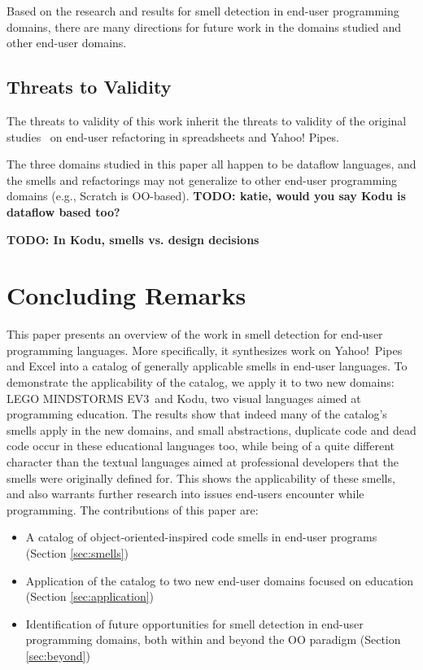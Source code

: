 \documentclass{sig-alternate}
\newcommand{\todo}[1]{\textbf{TODO: #1}}
\newcommand{\ms}{LEGO MINDSTORMS EV3}
\begin{document}
Based on the research and results for smell detection in end-user programming domains, there are many directions for future work in the domains studied and other end-user domains.





\subsection{Threats to Validity}
The threats to validity of this work inherit the threats to validity of the original studies~\cite{Stolee2015, Stolee2011, StoleeTSE2013, Hermans2011, Hermans2012intra, Hermans2012inter, hermans2014bumblebee, badame2012refactoring} on end-user refactoring in spreadsheets and Yahoo! Pipes.

The three domains studied in this paper all happen to be dataflow languages, and the smells and refactorings may not generalize to other end-user programming domains (e.g., Scratch is OO-based). \todo{katie, would you say Kodu is dataflow based too?}


\todo{In Kodu, smells vs. design decisions}

\section{Concluding Remarks}
\label{sec:conclusions}
This paper presents an overview of the work in smell detection for end-user programming languages. More specifically, it synthesizes work on Yahoo!\ Pipes and Excel into a catalog of generally applicable smells in end-user languages. To demonstrate the applicability of the catalog, we apply it to two new domains: \ms~and Kodu, two visual languages aimed at programming education. The results show that indeed many of the catalog's smells apply in the new domains, and small abstractions, duplicate code and dead code occur in these educational languages too, while being of a quite different character than the textual languages aimed at professional developers that the smells were originally defined for. This shows the applicability of these smells, and also warrants further research into issues end-users encounter while programming. The contributions of this paper are:

\begin{itemize}
	\item A catalog of object-oriented-inspired code smells in end-user programs (Section \ref{sec:smells})
	\item Application of the catalog to two new end-user domains focused on education (Section \ref{sec:application})
	\item Identification of future opportunities for smell detection in end-user programming domains, both within and beyond the OO paradigm (Section \ref{sec:beyond})
\end{itemize}
\end{document}
